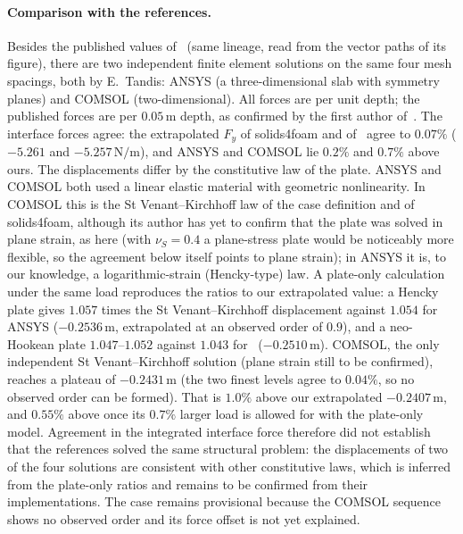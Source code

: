\paragraph{Comparison with the references.}
Besides the published values of~\citet{Tukovic2018} (same lineage, read from the vector paths of its figure), there are two independent finite element solutions on the same four mesh spacings, both by E.~Tandis: ANSYS (a three-dimensional slab with symmetry planes) and COMSOL (two-dimensional). All forces are per unit depth; the published forces are per $0.05\,\mathrm{m}$ depth, as confirmed by the first author of~\citet{Tukovic2018}.
The interface forces agree: the extrapolated $F_y$ of solids4foam and of~\citet{Tukovic2018} agree to $0.07\%$ ($-5.261$ and $-5.257\,\mathrm{N/m}$), and ANSYS and COMSOL lie $0.2\%$ and $0.7\%$ above ours.
The displacements differ by the constitutive law of the plate. ANSYS and COMSOL both used a linear elastic material with geometric nonlinearity. In COMSOL this is the St Venant--Kirchhoff law of the case definition and of solids4foam, although its author has yet to confirm that the plate was solved in plane strain, as here (with $\nu_S = 0.4$ a plane-stress plate would be noticeably more flexible, so the agreement below itself points to plane strain); in ANSYS it is, to our knowledge, a logarithmic-strain (Hencky-type) law.
A plate-only calculation under the same load reproduces the ratios to our extrapolated value: a Hencky plate gives $1.057$ times the St Venant--Kirchhoff displacement against $1.054$ for ANSYS ($-0.2536\,\mathrm{m}$, extrapolated at an observed order of $0.9$), and a neo-Hookean plate $1.047$--$1.052$ against $1.043$ for~\citet{Tukovic2018} ($-0.2510\,\mathrm{m}$).
COMSOL, the only independent St Venant--Kirchhoff solution (plane strain still to be confirmed), reaches a plateau of $-0.2431\,\mathrm{m}$ (the two finest levels agree to $0.04\%$, so no observed order can be formed). That is $1.0\%$ above our extrapolated $-0.2407\,\mathrm{m}$, and $0.55\%$ above once its $0.7\%$ larger load is allowed for with the plate-only model.
Agreement in the integrated interface force therefore did not establish that the references solved the same structural problem: the displacements of two of the four solutions are consistent with other constitutive laws, which is inferred from the plate-only ratios and remains to be confirmed from their implementations. The case remains provisional because the COMSOL sequence shows no observed order and its force offset is not yet explained.

